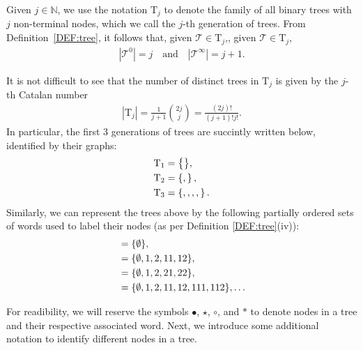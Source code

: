 \documentclass[a4paper,
11pt,  reqno]{amsart}
\makeatletter
\newcommand{\blue}{\color{blue}}
\newcommand{\orange}{\color{orange}}
\newcommand{\5}{\textup{V}}
\newcommand{\noi}{\noindent}
\theoremstyle{remark}
\newcommand{\bul}{\bullet}
\newcommand{\TT}{\mathcal{T}}
\newcommand{\Tr}{\mathrm{T}}
\newcommand{\N}{\mathbb{N}}
\def\<#1>{\csname MH@symb@#1\endcsname}
\numberwithin{equation}{section}
\numberwithin{theorem}{section}
\makeatother
\begin{document}
Given $j\in\N$, we use the notation $\Tr_j$ to denote the family of all binary trees
with $j$ non-terminal nodes, which we call the $j$-th generation of trees. From Definition~\ref{DEF:tree}, it follows that{\orange , given $\TT\in\Tr_j$,}{\blue, given $\TT\in\Tr_j$,}
\begin{align}
| \TT^0 |  = j \quad \text{and} \quad |\TT^\infty| = j+1.
\end{align}


\noi
It is not difficult to see that the number of distinct trees in $\Tr_j$ is given by the $j$-th Catalan number
\begin{align}\label{eq:catalan}
| \Tr_j | = \frac{1}{j+1} \binom{2j}{j}  = \frac{(2j)!}{(j+1)! j !}.
\end{align}
In particular, the first 3 generations of trees are succintly written below, identified by their graphs:
\begin{align*}
\Tr_1 & = \big\{ \<1> \big\}, \\
\Tr_2 & = \left\{ \<21>, \<22> \right\}, \\
\Tr_3 &  = \left\{ \<31>, \<32>, \<33>, \<34>, \<35> \right\}.
\end{align*}
Similarly, we can represent the trees above by the following partially ordered sets of words used to label their nodes (as per Definition \ref{DEF:tree}(iv)):
\begin{align}
\<1> 
&
= \{\emptyset\}
, 
\\
\<21>
&
=
\{ \emptyset, 1 ,2, 11,12  \}
, 
\\
\<22>
&
=
\{\emptyset, 1,2, 21,22\}
, 
\\
\<31>
&
= 
\{
\emptyset, 1,2, 11,12, 111, 112
\}
, \ldots
\end{align}




\smallskip








For readibility, we will reserve the symbols $\bul$, $\star$, $\circ$, and $\ast$ to denote nodes in a tree and their respective associated word. 
Next, we introduce some additional notation to identify different nodes in a tree. 
\end{document}
